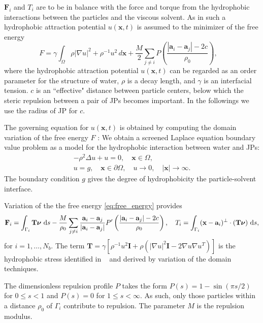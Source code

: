 \documentclass[prb,preprint,showpacs,preprintnumbers,amsmath,amssymb,longbibliography]{revtex4-1}
\renewcommand{\aa}{\mathbf{a}}
\newcommand{\bd}{\partial}
\newcommand{\FF}{\mathbf{F}}
\newcommand{\nnu}{\boldsymbol{\nu}}
\newcommand{\xx}{\mathbf{x}}
\begin{document}
$\FF_i$ and $T_i$ are to be in balance with the force and torque from the hydrophobic interactions between the
particles and the viscous solvent. As in \citet{Fu2022_JFM} such a hydrophobic attraction potential $u(\xx,t)$ is assumed to
the minimizer of the free energy
\begin{equation}
\label{eq:free_energy}
F = \gamma
\int_{\Omega} \rho |\nabla u|^2 + \rho^{-1} u^2
\,d\xx
+ \frac{M}{2}
\sum_{j \neq i} 
P\left(\frac{|\aa_i - \aa_j|-2c}{\rho_0}\right), \quad
\end{equation}
where the hydrophobic attraction potential $u(\xx,t)$ can be regarded as an order parameter for the structure of water,
$\rho$ is a decay length, and $\gamma$ is an interfacial tension. 
$c$ is an ``effective" distance between particle centers, below which the steric repulsion between a pair of JPs becomes important.
In the followings we use the radius of JP for $c$.

The governing equation for $u(\xx,t)$ is obtained by computing the domain variation of the free energy $F$ \cite{Fu20}:
We obtain
a screened Laplace equation boundary value problem as a model for the hydrophobic interaction between water and JPs:
\begin{gather}
  \label{eq:SL}
  -\rho^2 \Delta u + u = 0,\quad \xx \in \Omega, \\
  u = g, \quad \xx \in \bd\Omega, \quad 
  u \rightarrow 0, \quad |\xx| \rightarrow \infty.
\end{gather}
The boundary condition $g$ gives the degree of hydrophobicity the
particle-solvent interface.

Variation of the the free energy \eqref{eq:free_energy} provides
\begin{equation}
  \FF_i = \int_{\Gamma_i} \mathbf{T}\nnu \, \dif s
  - \frac{M}{\rho_0}
  \sum_{j \neq i}
  \frac{\aa_i - \aa_j}{|\aa_i - \aa_j|}
P'\left(\frac{|\aa_i - \aa_j|-2c}{\rho_0}\right)
  ,\quad
T_i = \int_{\Gamma_i} (\xx - \aa_i)^{\perp}\cdot (\mathbf{T}\nnu) \, \dif s, 
\end{equation}
for $i = 1,\dots,N_b$. The term 
$
\mathbf{T}
= \gamma \left[ \rho^{-1} u^2 \mathbf{I}
  + \rho \left(|\nabla u|^2 \mathbf{I} - 2\nabla u \nabla u^T\right)\right]
$
is the hydrophobic stress identified in ~\cite{Fu20} and derived by
variation of the domain techniques.

The dimensionless repulsion profile $P$ takes the form $P(s) = 1 -
\sin(\pi s/2)$ for $0 \leq s < 1$ and $P(s) = 0$ for $1 \leq s <
\infty$.  As such, only those particles within a distance $\rho_0$ of
$\Gamma_i$ contribute to repulsion.  The parameter $M$ is the repulsion
modulus.
\end{document}
